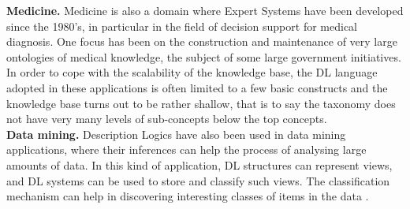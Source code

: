 \documentclass[a4paper, 11pt, oneside]{elsarticle}
\begin{document}
\textbf{Medicine.} Medicine is also a domain where Expert Systems have been developed since the 1980’s, in particular in the field of decision support for medical diagnosis. One focus has been on the construction and maintenance of very large ontologies of medical knowledge, the subject of some large government initiatives.
In order to cope with the scalability of the knowledge base, the DL language adopted in these applications is often limited to a few basic constructs and the knowledge base turns out to be rather shallow, that is to say the taxonomy does not have very many levels of sub-concepts below the top concepts.\\

\textbf{Data mining.} Description Logics have also been used in data mining applications, where their inferences can help the process of analysing large amounts of data.
In this kind of application, DL structures can represent views, and DL systems can be used to store and classify such views. The classification mechanism can help in discovering interesting classes of items in the data
\cite{Nardi:2003:IDL:885746.885748}.

\newpage
\end{document}
